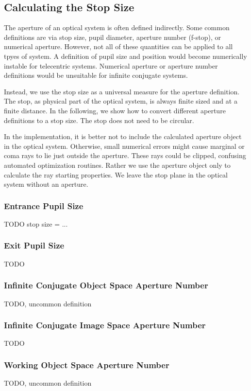 \documentclass[12pt,a4paper,twoside,openright,BCOR10mm,headsepline,titlepage,abstracton,chapterprefix,final]{scrreprt}
\begin{document}
\subsection{Calculating the Stop Size}
The aperture of an optical system is often defined indirectly.
Some common definitions are via stop size, pupil diameter, aperture number (f-stop), or numerical aperture.
However, not all of these quantities can be applied to all tpyes of system.
A definition of pupil size and position would become numerically instable for telecentric systems.
Numerical aperture or aperture number definitions would be unsuitable for infinite conjugate systems.

Instead, we use the stop size as a universal measure for the aperture definition.
The stop, as physical part of the optical system, is always finite sized and at a finite distance.
In the following, we show how to convert different aperture definitions to a stop size.
The stop does not need to be circular. 

In the implementation, it is better not to include the calculated aperture object in the optical system.
Otherwise, small numerical errors might cause marginal or coma rays to lie just outside the aperture.
These rays could be clipped, confusing automated optimization routines.
Rather we use the aperture object only to calculate the ray starting properties.
We leave the stop plane in the optical system without an aperture.


\subsubsection{Entrance Pupil Size}
TODO
stop size = ...

\subsubsection{Exit Pupil Size}
TODO

\subsubsection{Infinite Conjugate Object Space Aperture Number}
TODO, uncommon definition

\subsubsection{Infinite Conjugate Image Space Aperture Number}
TODO

\subsubsection{Working Object Space Aperture Number}
TODO, uncommon definition
\end{document}
